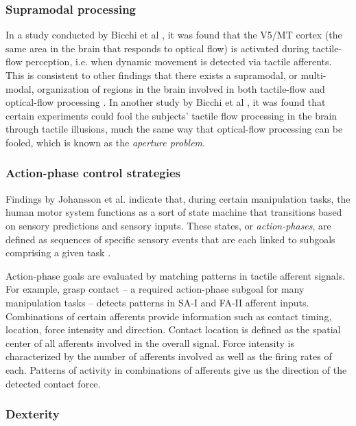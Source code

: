 \subsubsection*{Supramodal processing}

In a study conducted by Bicchi et al \cite{scilingo2004perception}, it was found that the V5/MT cortex (the same area in the brain that responds to optical flow) is activated during tactile-flow perception, i.e. when dynamic movement is detected via tactile afferents.
This is consistent to other findings that there exists a supramodal, or multi-modal, organization of regions in the brain involved in both tactile-flow and optical-flow processing \cite{flanagan2006control}.
In another study by Bicchi et al \cite{bicchi2003haptic}, it was found that certain experiments could fool the subjects' tactile flow processing in the brain through tactile illusions, much the same way that optical-flow processing can be fooled, which is known as the \emph{aperture problem}.

\subsubsection*{Action-phase control strategies}

Findings by Johansson et al. indicate that, during certain manipulation tasks, the human motor system functions as a sort of state machine that transitions based on sensory predictions and sensory inputs.
These states, or \emph{action-phases}, are defined as sequences of specific sensory events that are each linked to subgoals comprising a given task \cite{johansson2009coding}.

Action-phase goals are evaluated by matching patterns in tactile afferent signals.
For example, grasp contact – a required action-phase subgoal for many manipulation tasks – detects patterns in SA-I and FA-II afferent inputs.
Combinations of certain afferents provide information such as contact timing, location, force intensity and direction.
Contact location is defined as the spatial center of all afferents involved in the overall signal.
Force intensity is characterized by the number of afferents involved as well as the firing rates of each.
Patterns of activity in combinations of afferents give us the direction of the detected contact force.

\subsubsection*{Dexterity}

